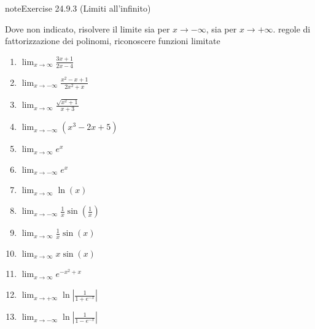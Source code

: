 \documentclass[letterpaper,10pt,italian]{jupyterBook}
\begin{document}
\begin{sphinxadmonition}{note}{Exercise 24.9.3 (Limiti all’infinito)}





\sphinxAtStartPar
Dove non indicato, risolvere il limite sia per \(x \rightarrow - \infty\), sia per \(x \rightarrow + \infty\).  regole di fattorizzazione dei polinomi, riconoscere funzioni limitate
\begin{enumerate}
%
\item {} 
\sphinxAtStartPar
\(\lim_{x \to \infty} \frac{3x + 1}{2x - 4}\)

\item {} 
\sphinxAtStartPar
\(\lim_{x \to -\infty} \frac{x^2 - x + 1}{2x^2 + x}\)

\item {} 
\sphinxAtStartPar
\(\lim_{x \to \infty} \frac{\sqrt{x^2 + 1}}{x + 3}\)

\item {} 
\sphinxAtStartPar
\(\lim_{x \to -\infty} (x^3 - 2x + 5)\)

\item {} 
\sphinxAtStartPar
\(\lim_{x \to \infty} e^x\)

\item {} 
\sphinxAtStartPar
\(\lim_{x \to -\infty} e^x\)

\item {} 
\sphinxAtStartPar
\(\lim_{x \to \infty} \ln(x)\)

\item {} 
\sphinxAtStartPar
\(\lim_{x \to -\infty} \frac{1}{x} \sin\left(\frac{1}{x}\right)\)

\item {} 
\sphinxAtStartPar
\(\lim_{x \to \infty} \frac{1}{x} \sin\left( x \right)\)

\item {} 
\sphinxAtStartPar
\(\lim_{x \to \infty} x \sin\left( x \right)\)

\item {} 
\sphinxAtStartPar
\(\lim_{x \to \infty} e^{-x^2+x}\)

\item {} 
\sphinxAtStartPar
\(\lim_{x \to +\infty} \ln \left| \frac{1}{1 + e^{-x}} \right|\)

\item {} 
\sphinxAtStartPar
\(\lim_{x \to -\infty} \ln \left| \frac{1}{1 - e^{-x}} \right|\)

\end{enumerate}
\end{sphinxadmonition}
\end{document}
